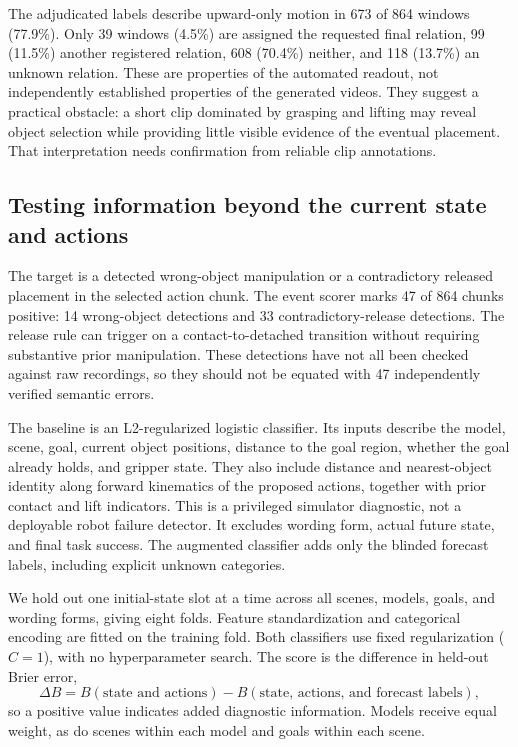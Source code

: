 \documentclass{article}
\begin{document}
The adjudicated labels describe upward-only motion in 673 of 864 windows (77.9\%). Only 39 windows (4.5\%) are assigned the requested final relation, 99 (11.5\%) another registered relation, 608 (70.4\%) neither, and 118 (13.7\%) an unknown relation. These are properties of the automated readout, not independently established properties of the generated videos. They suggest a practical obstacle: a short clip dominated by grasping and lifting may reveal object selection while providing little visible evidence of the eventual placement. That interpretation needs confirmation from reliable clip annotations.

\subsection{Testing information beyond the current state and actions}

The target is a detected wrong-object manipulation or a contradictory released placement in the selected action chunk. The event scorer marks 47 of 864 chunks positive: 14 wrong-object detections and 33 contradictory-release detections. The release rule can trigger on a contact-to-detached transition without requiring substantive prior manipulation. These detections have not all been checked against raw recordings, so they should not be equated with 47 independently verified semantic errors.

The baseline is an L2-regularized logistic classifier. Its inputs describe the model, scene, goal, current object positions, distance to the goal region, whether the goal already holds, and gripper state. They also include distance and nearest-object identity along forward kinematics of the proposed actions, together with prior contact and lift indicators. This is a privileged simulator diagnostic, not a deployable robot failure detector. It excludes wording form, actual future state, and final task success. The augmented classifier adds only the blinded forecast labels, including explicit unknown categories.

We hold out one initial-state slot at a time across all scenes, models, goals, and wording forms, giving eight folds. Feature standardization and categorical encoding are fitted on the training fold. Both classifiers use fixed regularization ($C=1$), with no hyperparameter search. The score is the difference in held-out Brier error,
\[
\Delta B = B(\text{state and actions}) - B(\text{state, actions, and forecast labels}),
\]
so a positive value indicates added diagnostic information. Models receive equal weight, as do scenes within each model and goals within each scene.
\end{document}
